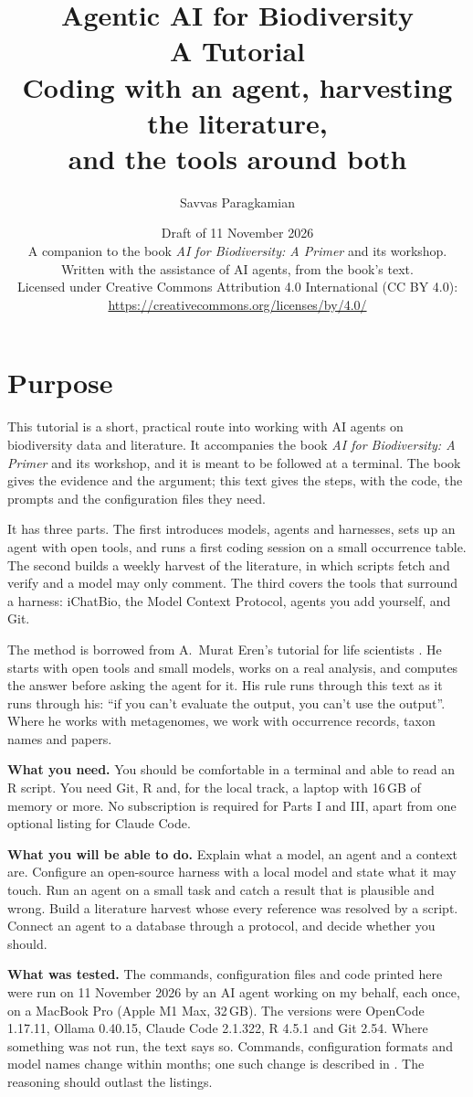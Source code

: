 \documentclass[11pt,a4paper]{article}
\title{Agentic AI for Biodiversity\\[0.3em]\large A Tutorial\\[0.8em]
  \normalsize\normalfont Coding with an agent, harvesting the literature,\\
  and the tools around both}
\author{Savvas Paragkamian}
\date{%
  Draft of 11 November 2026\\[1.5em]
  \normalsize\normalfont
  A companion to the book \emph{AI for Biodiversity: A Primer} and its
  workshop.\\
  Written with the assistance of AI agents, from the book's text.\\[1.5em]
  \small Licensed under Creative Commons Attribution 4.0 International
  (CC BY 4.0):\\
  \url{https://creativecommons.org/licenses/by/4.0/}%
}
\begin{document}
\maketitle

\section*{Purpose}

This tutorial is a short, practical route into working with AI agents on
biodiversity data and literature. It accompanies the book \emph{AI for
Biodiversity: A Primer} and its workshop, and it is meant to be followed at a
terminal. The book gives the evidence and the argument; this text gives the
steps, with the code, the prompts and the configuration files they need.

It has three parts. The first introduces models, agents and harnesses, sets
up an agent with open tools, and runs a first coding session on a small
occurrence table. The second builds a weekly harvest of the literature, in
which scripts fetch and verify and a model may only comment. The third covers
the tools that surround a harness: iChatBio, the Model Context Protocol,
agents you add yourself, and Git.

The method is borrowed from A.~Murat Eren's tutorial for life scientists
\parencite{eren2026agenticcoding}. He starts with open tools and small
models, works on a real analysis, and computes the answer before asking the
agent for it. His rule runs through this text as it runs through his: ``if
you can't evaluate the output, you can't use the output''. Where he works
with metagenomes, we work with occurrence records, taxon names and papers.

\textbf{What you need.} You should be comfortable in a terminal and able to
read an R script. You need Git, R and, for the local track, a laptop with
16\,GB of memory or more. No subscription is required for Parts I and III,
apart from one optional listing for Claude Code.

\textbf{What you will be able to do.} Explain what a model, an agent and a
context are. Configure an open-source harness with a local model and state
what it may touch. Run an agent on a small task and catch a result that is
plausible and wrong. Build a literature harvest whose every reference was
resolved by a script. Connect an agent to a database through a protocol, and
decide whether you should.

\textbf{What was tested.} The commands, configuration files and code printed
here were run on 11 November 2026 by an AI agent working on my behalf, each
once, on a MacBook Pro (Apple M1 Max, 32\,GB). The versions were OpenCode
1.17.11, Ollama 0.40.15, Claude Code 2.1.322, R 4.5.1 and Git 2.54. Where
something was not run, the text says so. Commands, configuration formats and
model names change within months; one such change is described in
. The reasoning should outlast the listings.
\end{document}
